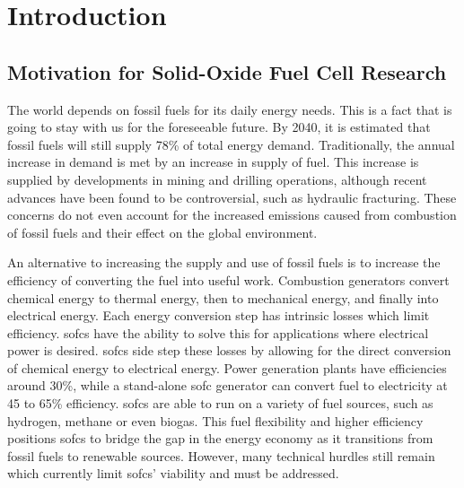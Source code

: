 


\chapter{Introduction}

\section{Motivation for Solid-Oxide Fuel Cell Research}
    The world depends on fossil fuels for its daily energy needs.
    This is a fact that is going to stay with us for the foreseeable future.
    By 2040, it is estimated that fossil fuels will still supply  78\% of total energy demand.\cite{U.S.EnergyInformationAdministration2016}
    Traditionally, the annual increase in demand is met by an increase in supply of fuel.
    This increase is supplied by developments in mining and drilling operations, although recent advances have been found to be controversial, such as hydraulic fracturing.\cite{Osborn2011,Vengosh2014}
    These concerns do not even account for the increased emissions caused from combustion of fossil fuels and their effect on the global environment.\cite{Solomon2009,Hansen1981,U.S.EnvironmentalProtectionAgency2017}

    An alternative to increasing the supply and use of fossil fuels is to increase the efficiency of converting the fuel into useful work.
    Combustion generators convert chemical energy to thermal energy, then to mechanical energy, and finally into electrical energy.
    Each energy conversion step has intrinsic losses which limit efficiency.
    \Glspl{sofc} have the ability to solve this for applications where electrical power is desired.
    \Glspl{sofc} side step these losses by allowing for the direct conversion of chemical energy to electrical energy.
    Power generation plants have efficiencies around 30\%, while a stand-alone \gls{sofc} generator can convert fuel to electricity at 45 to 65\% efficiency.\cite{Wachsman2011a,Lasseter2004}
    \Glspl{sofc} are able to run on a variety of fuel sources, such as hydrogen, methane or even biogas.\cite{Park2000}
    This fuel flexibility and higher efficiency positions \glspl{sofc} to bridge the gap in the energy economy as it transitions from fossil fuels to renewable sources.
    However, many technical hurdles still remain which currently limit \glspl{sofc}' viability and must be addressed.

